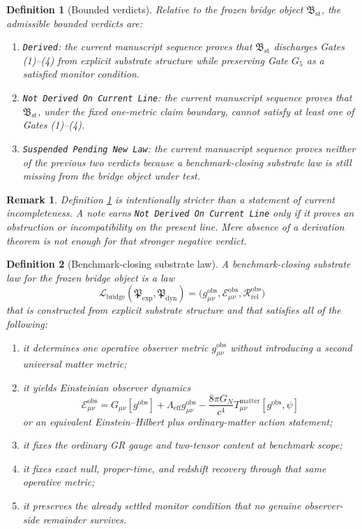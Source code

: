 \documentclass[11pt]{article}
\newcommand{\ExplicitPackage}{\mathfrak P_{\mathrm{exp}}}
\newcommand{\PrimitiveFamily}{\mathfrak P_{\mathrm{dyn}}}
\newcommand{\StableBridgeObject}{\mathfrak B_{\mathrm{st}}}
\newcommand{\GateFive}{G_{5}}
\newcommand{\BridgeLaw}{\mathcal L_{\mathrm{bridge}}}
\newtheorem{definition}{Definition}
\newtheorem{remark}{Remark}
\begin{document}
\begin{definition}[Bounded verdicts]
\label{def:verdicts}
Relative to the frozen bridge object \(\StableBridgeObject\), the admissible bounded verdicts are:
\begin{enumerate}
    \item \texttt{Derived}: the current manuscript sequence proves that \(\StableBridgeObject\) discharges Gates (1)--(4) from explicit substrate structure while preserving Gate \(\GateFive\) as a satisfied monitor condition.
    \item \texttt{Not Derived On Current Line}: the current manuscript sequence proves that \(\StableBridgeObject\), under the fixed one-metric claim boundary, cannot satisfy at least one of Gates (1)--(4).
    \item \texttt{Suspended Pending New Law}: the current manuscript sequence proves neither of the previous two verdicts because a benchmark-closing substrate law is still missing from the bridge object under test.
\end{enumerate}
\end{definition}

\begin{remark}
Definition \ref{def:verdicts} is intentionally stricter than a statement of current incompleteness. A note earns \texttt{Not Derived On Current Line} only if it proves an obstruction or incompatibility on the present line. Mere absence of a derivation theorem is not enough for that stronger negative verdict.
\end{remark}

\begin{definition}[Benchmark-closing substrate law]
\label{def:bridge_law}
A \emph{benchmark-closing substrate law} for the frozen bridge object is a law
\[
\BridgeLaw(\ExplicitPackage,\PrimitiveFamily)
=
\bigl(
g_{\mu\nu}^{\mathrm{obs}},
\mathcal E_{\mu\nu}^{\mathrm{obs}},
\mathcal R_{\mathrm{rel}}^{\mathrm{obs}}
\bigr)
\]
that is constructed from explicit substrate structure and that satisfies all of the following:
\begin{enumerate}
    \item it determines one operative observer metric \(g_{\mu\nu}^{\mathrm{obs}}\) without introducing a second universal matter metric;
    \item it yields Einsteinian observer dynamics
    \[
    \mathcal E_{\mu\nu}^{\mathrm{obs}}
    =
    G_{\mu\nu}[g^{\mathrm{obs}}]
    +\Lambda_{\mathrm{eff}}g_{\mu\nu}^{\mathrm{obs}}
    -\frac{8\pi G_N}{c^4}T_{\mu\nu}^{\mathrm{matter}}[g^{\mathrm{obs}},\psi]
    \]
    or an equivalent Einstein--Hilbert plus ordinary-matter action statement;
    \item it fixes the ordinary GR gauge and two-tensor content at benchmark scope;
    \item it fixes exact null, proper-time, and redshift recovery through that same operative metric;
    \item it preserves the already settled monitor condition that no genuine observer-side remainder survives.
\end{enumerate}
\end{definition}
\end{document}

